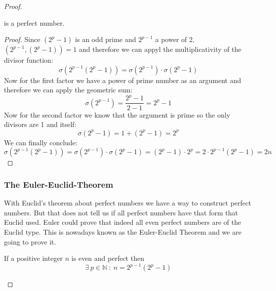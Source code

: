 \documentclass{article}
\theoremstyle{definition}
\begin{document}
\begin{proof}
\begin{theorem}
    is a perfect number.
\end{theorem}
\begin{proof}
Since $(2^p-1)$ is an odd prime and $2^{p-1}$ a power of 2, $(2^{p-1},(2^p-1))=1$ and therefore we can appyl the multiplicativity of the divisor function:
    \begin{equation}
        \sigma(2^{p-1}(2^p-1)) = \sigma(2^{p-1})\cdot \sigma(2^p-1)
    \end{equation}
    Now for the first factor we have a power of prime number as an argument and therefore we can apply the geometric sum:
    \begin{equation}
        \sigma(2^{p-1}) = \frac{2^p-1}{2-1}=2^p-1
    \end{equation}
    Now for the second factor we know that the argument is prime so the only divisors are 1 and itself:
    \begin{equation}
        \sigma(2^p-1) = 1 + (2^p-1) = 2^p
    \end{equation}
    We can finally conclude:
    \begin{equation}
        \sigma(2^{p-1}(2^p-1)) = \sigma(2^{p-1})\cdot \sigma(2^p-1) = 
        (2^p-1)\cdot 2^p = 2 \cdot 2^{p-1}(2^p-1) = 2n
    \end{equation}
\end{proof}

\subsubsection{The Euler-Euclid-Theorem}
With Euclid's theorem about perfect numbers we have a way to construct perfect numbers. But that does not tell us if all perfect numbers have that form that Euclid used. Euler could prove that indeed all even perfect numbers are of the Euclid type. This is nowadays known as the Euler-Euclid Theorem and we are going to prove it.
\begin{theorem}
    If a positive integer $n$ is even and perfect then 
    \begin{equation}
        \exists \: p \in \mathbb{N} \: : \: n = 2^{p-1}(2^p-1)
    \end{equation}
\end{theorem}


\end{proof}
\end{document}
